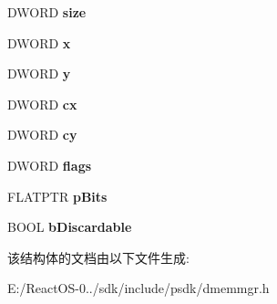 \begin{DoxyCompactItemize}
\mbox{\label{struct___v_m_e_m_r_a943f314333492637e69901f83c9ccad3}} 
D\+W\+O\+RD {\bfseries size}
\item 
\mbox{\label{struct___v_m_e_m_r_a4c06991dbf7861e1af2679239ccb9b1f}} 
D\+W\+O\+RD {\bfseries x}
\item 
\mbox{\label{struct___v_m_e_m_r_a443dda4ead3247a6f6a94b728732fd60}} 
D\+W\+O\+RD {\bfseries y}
\item 
\mbox{\label{struct___v_m_e_m_r_a511801eae339d952a20cb4f0a002308b}} 
D\+W\+O\+RD {\bfseries cx}
\item 
\mbox{\label{struct___v_m_e_m_r_a6518369f8e8e09064e5d1327b4a400cd}} 
D\+W\+O\+RD {\bfseries cy}
\item 
\mbox{\label{struct___v_m_e_m_r_ac1d0e978761e0c259f2811e571b3d2a3}} 
D\+W\+O\+RD {\bfseries flags}
\item 
\mbox{\label{struct___v_m_e_m_r_aefff5b88d6b0fdb80785b1f3caed625d}} 
F\+L\+A\+T\+P\+TR {\bfseries p\+Bits}
\item 
\mbox{\label{struct___v_m_e_m_r_a23653a2d9ac114b0829868d09889983c}} 
B\+O\+OL {\bfseries b\+Discardable}
\end{DoxyCompactItemize}


该结构体的文档由以下文件生成\+:\begin{DoxyCompactItemize}
\item 
E\+:/\+React\+O\+S-\/0../sdk/include/psdk/dmemmgr.\+h\end{DoxyCompactItemize}
